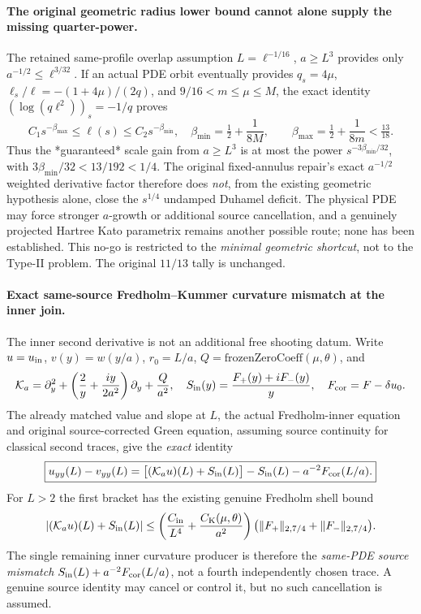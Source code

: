 \documentclass[11pt]{amsart}
\begin{document}
\paragraph{The original geometric radius lower bound cannot alone supply the missing quarter-power.}
The retained same-profile overlap assumption
\(L=\ell^{-1/16}\), \(a\ge L^3\) provides
only \(a^{-1/2}\le\ell^{3/32}\).
If an actual PDE orbit eventually provides
\(q_s=4\mu\),
\(\ell_s/\ell=-(1+4\mu)/(2q)\),
and \(9/16<m\le\mu\le M\), the exact identity
\((\log(q\ell^2))_s=-1/q\) proves
\[
 C_1s^{-\beta_{\max}}\le\ell(s)
 \le C_2s^{-\beta_{\min}},\quad
 \beta_{\min}=\tfrac12+\frac1{8M},\qquad
 \beta_{\max}=\tfrac12+\frac1{8m}<\tfrac{13}{18}.
\]
Thus the *guaranteed* scale gain from \(a\ge L^3\)
is at most the power \(s^{-3\beta_{\min}/32}\),
with \(3\beta_{\min}/32<13/192<1/4\).
The original fixed-annulus repair's exact \(a^{-1/2}\)
weighted derivative factor therefore does \emph{not},
from the existing geometric hypothesis alone, close
the \(s^{1/4}\) undamped Duhamel deficit. The
physical PDE may force stronger \(a\)-growth or
additional source cancellation, and a genuinely
projected Hartree Kato parametrix remains another
possible route; none has been established.
This no-go is restricted to the \emph{minimal
geometric shortcut}, not to the Type-II problem.
The original \(11/13\) tally is unchanged.



\paragraph{Exact same-source Fredholm--Kummer curvature mismatch at the inner join.}
The inner second derivative is not an additional free shooting datum.
Write \(u=u_{\rm in}\), \(v(y)=w(y/a)\),
\(r_0=L/a\), \(Q=\mathrm{frozenZeroCoeff}(\mu,\theta)\), and
\[
 \mathcal K_a=\partial_y^2+
  \left(\frac2y+\frac{iy}{2a^2}\right)\partial_y+
  \frac{Q}{a^2},\quad
 S_{\rm in}(y)=\frac{F_+(y)+iF_-(y)}y,\quad
 F_{\rm cor}=F-\delta u_0.
\]
The already matched value and slope at \(L\), the actual
Fredholm-inner equation and original source-corrected Green
equation, assuming source continuity for classical second traces,
give the \emph{exact} identity
\[
 \boxed{
 u_{yy}(L)-v_{yy}(L)
 =\bigl[(\mathcal K_a u)(L)+S_{\rm in}(L)\bigr]
   -S_{\rm in}(L)-a^{-2}F_{\rm cor}(L/a).
 }
\]
For \(L>2\) the first bracket has the existing genuine Fredholm
shell bound
\[
 |(\mathcal K_a u)(L)+S_{\rm in}(L)|
 \le\left(\frac{C_{\rm in}}{L^4}+
 \frac{C_{\rm K}(\mu,\theta)}{a^2}\right)
 \bigl(\|F_+\|_{2,7/4}+\|F_-\|_{2,7/4}\bigr).
\]
The single remaining inner curvature producer is therefore the
\emph{same-PDE source mismatch}
\(S_{\rm in}(L)+a^{-2}F_{\rm cor}(L/a)\),
not a fourth independently chosen trace. A genuine source identity
may cancel or control it, but no such cancellation is assumed.
\end{document}

